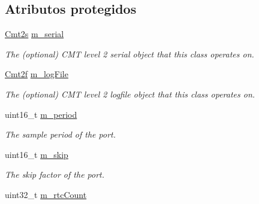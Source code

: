 \subsection*{\-Atributos protegidos}
\begin{DoxyCompactItemize}
\item 
\hypertarget{classxsens_1_1Cmt3_accbbd4f1428154505407617a0b445a74}{\hyperlink{classxsens_1_1Cmt2s}{\-Cmt2s} \hyperlink{classxsens_1_1Cmt3_accbbd4f1428154505407617a0b445a74}{m\-\_\-serial}}\label{classxsens_1_1Cmt3_accbbd4f1428154505407617a0b445a74}

\begin{DoxyCompactList}\small\item\em \-The (optional) \-C\-M\-T level 2 serial object that this class operates on. \end{DoxyCompactList}\item 
\hypertarget{classxsens_1_1Cmt3_a2557f6a252e4da9e84e7c0583e12ae13}{\hyperlink{classxsens_1_1Cmt2f}{\-Cmt2f} \hyperlink{classxsens_1_1Cmt3_a2557f6a252e4da9e84e7c0583e12ae13}{m\-\_\-log\-File}}\label{classxsens_1_1Cmt3_a2557f6a252e4da9e84e7c0583e12ae13}

\begin{DoxyCompactList}\small\item\em \-The (optional) \-C\-M\-T level 2 logfile object that this class operates on. \end{DoxyCompactList}\item 
\hypertarget{classxsens_1_1Cmt3_a062e90d2b80a1af863e7359a447a976d}{uint16\-\_\-t \hyperlink{classxsens_1_1Cmt3_a062e90d2b80a1af863e7359a447a976d}{m\-\_\-period}}\label{classxsens_1_1Cmt3_a062e90d2b80a1af863e7359a447a976d}

\begin{DoxyCompactList}\small\item\em \-The sample period of the port. \end{DoxyCompactList}\item 
\hypertarget{classxsens_1_1Cmt3_aaedd07b2a6a9d26283daf93000535353}{uint16\-\_\-t \hyperlink{classxsens_1_1Cmt3_aaedd07b2a6a9d26283daf93000535353}{m\-\_\-skip}}\label{classxsens_1_1Cmt3_aaedd07b2a6a9d26283daf93000535353}

\begin{DoxyCompactList}\small\item\em \-The skip factor of the port. \end{DoxyCompactList}\item 
\hypertarget{classxsens_1_1Cmt3_af8b7b0c59fec84e9e9946ada173f65ae}{uint32\-\_\-t \hyperlink{classxsens_1_1Cmt3_af8b7b0c59fec84e9e9946ada173f65ae}{m\-\_\-rtc\-Count}}\label{classxsens_1_1Cmt3_af8b7b0c59fec84e9e9946ada173f65ae}


\end{DoxyCompactItemize}
